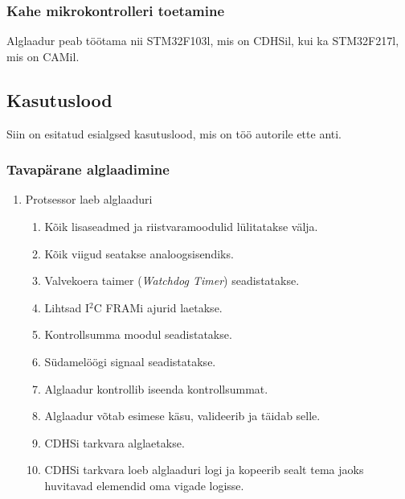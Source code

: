 \documentclass[12pt,a4paper]{article}
\newcommand{\iic}{I${}^2$C }
\begin{document}
\subsubsection{Kahe mikrokontrolleri toetamine}
Alglaadur peab töötama nii STM32F103l, mis on CDHSil, kui ka
STM32F217l, mis on CAMil.

\subsection{Kasutuslood}
Siin on esitatud esialgsed kasutuslood, mis on töö autorile ette anti.
\subsubsection{Tavapärane alglaadimine}
\label{sec:usecase:default}
\begin{enumerate}
\item Protsessor laeb alglaaduri
	\begin{enumerate}
	\item Kõik lisaseadmed ja riistvaramoodulid lülitatakse välja.
	\item Kõik viigud seatakse analoogsisendiks.
	\item Valvekoera taimer (\textit{Watchdog Timer}) seadistatakse.
	\item Lihtsad \iic FRAMi ajurid laetakse.
	\item Kontrollsumma moodul seadistatakse.
	\item Südamelöögi signaal seadistatakse.
	\item Alglaadur kontrollib iseenda kontrollsummat.
	\item Alglaadur võtab esimese käsu, valideerib ja täidab selle.
	\item CDHSi tarkvara alglaetakse.
	\item CDHSi tarkvara loeb alglaaduri logi ja kopeerib sealt tema jaoks
		huvitavad elemendid oma vigade logisse.
	\end{enumerate}
\end{enumerate}
\end{document}
